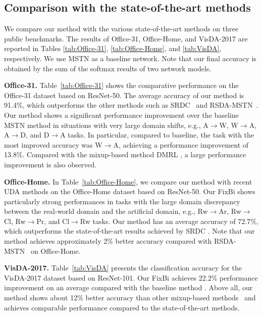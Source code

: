 \documentclass[final]{cvpr}
\begin{document}
\subsection{Comparison with the state-of-the-art methods}
We compare our method with the various state-of-the-art methods on three public benchmarks. The results of Office-31, Office-Home, and VisDA-2017 are reported in Tables \ref{tab:Office-31}, \ref{tab:Office-Home}, and \ref{tab:VisDA}, respectively. We use MSTN \cite{MSTN} as a baseline network. Note that our final accuracy is obtained by the sum of the softmax results of two network models. 

\textbf{Office-31.} Table~\ref{tab:Office-31} shows the comparative performance on the Office-31 dataset based on ResNet-50. The average accuracy of our method is 91.4\%, which outperforms the other methods such as SRDC~\cite{SRDC} and RSDA-MSTN~\cite{Gu2020}. Our method shows a significant performance improvement over the baseline MSTN \cite{MSTN} method in situations with very large domain shifts, e.g., A$\rightarrow$W, W$\rightarrow$A, A$\rightarrow$D, and D$\rightarrow$A tasks. In particular, compared to baseline, the task with the most improved accuracy was W$\rightarrow$A, achieving a performance improvement of 13.8\%. Compared with the mixup-based method DMRL \cite{Wu2020}, a large performance improvement is also observed. 

\textbf{Office-Home.} In Table~\ref{tab:Office-Home}, we compare our method with recent UDA methods on the Office-Home dataset based on ResNet-50. Our FixBi shows particularly strong performances in tasks with the large domain discrepancy between the real-world domain and the artificial domain, e.g., Rw$\rightarrow$Ar, Rw$\rightarrow$Cl, Rw$\rightarrow$Pr, and Cl$\rightarrow$Rw tasks. Our method has an average accuracy of 72.7\%, which outperforms the state-of-the-art results achieved by SRDC \cite{SRDC}. Note that our method achieves approximately 2\% better accuracy compared with RSDA-MSTN~\cite{Gu2020} on Office-Home.

\textbf{VisDA-2017.} Table~\ref{tab:VisDA} presents the classification accuracy for the VisDA-2017 dataset based on ResNet-101. Our FixBi achieves 22.2\% performance improvement on an average compared with the baseline method \cite{MSTN}. Above all, our method shows about 12\% better accuracy than other mixup-based methods~\cite{Wu2020, Minghao2020} and achieves comparable performance compared to the state-of-the-art methods.
\end{document}
